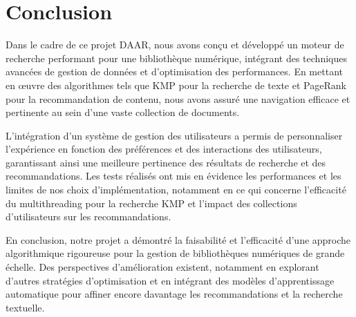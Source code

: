 \documentclass[11pt,english]{article}
\begin{document}
{    \section{Conclusion}

    \indent

    Dans le cadre de ce projet DAAR, nous avons conçu et développé un moteur de recherche performant pour une bibliothèque numérique, intégrant des techniques avancées de gestion de données et d'optimisation des performances. En mettant en œuvre des algorithmes tels que KMP pour la recherche de texte et PageRank pour la recommandation de contenu, nous avons assuré une navigation efficace et pertinente au sein d'une vaste collection de documents.

    \indent L'intégration d'un système de gestion des utilisateurs a permis de personnaliser l'expérience en fonction des préférences et des interactions des utilisateurs, garantissant ainsi une meilleure pertinence des résultats de recherche et des recommandations. Les tests réalisés ont mis en évidence les performances et les limites de nos choix d'implémentation, notamment en ce qui concerne l'efficacité du multithreading pour la recherche KMP et l'impact des collections d’utilisateurs sur les recommandations.

    \indent En conclusion, notre projet a démontré la faisabilité et l'efficacité d'une approche algorithmique rigoureuse pour la gestion de bibliothèques numériques de grande échelle. Des perspectives d'amélioration existent, notamment en explorant d'autres stratégies d'optimisation et en intégrant des modèles d'apprentissage automatique pour affiner encore davantage les recommandations et la recherche textuelle.
}
\end{document}
